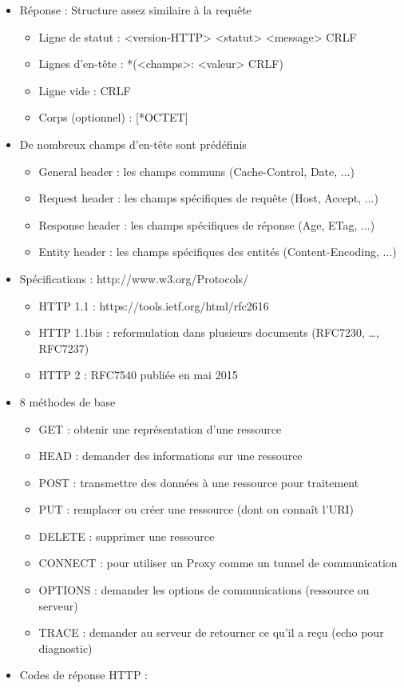 \documentclass[11pt,twoside,a4paper]{article}
\begin{document}
\begin{landscape}
\begin{multicols}{2}
\begin{itemize}
		\item R{\'e}ponse : Structure assez similaire {\`a} la requ{\^e}te
		\begin{itemize}
			\item Ligne de statut : <version-HTTP> <statut> <message> CRLF
			\item Lignes d'en-t{\^e}te : *(<champs>: <valeur> CRLF)
			\item Ligne vide : CRLF
			\item Corps (optionnel) : [*OCTET]
		\end{itemize}
		\item De nombreux champs d'en-t{\^e}te sont pr{\'e}d{\'e}finis
		\begin{itemize}
			\item General header : les champs communs (Cache-Control, Date, ...)
			\item Request header : les champs sp{\'e}cifiques de requ{\^e}te (Host, Accept, ...)
			\item Response header : les champs sp{\'e}cifiques de r{\'e}ponse (Age, ETag, ...)
			\item Entity header : les champs sp{\'e}cifiques des entit{\'e}s (Content-Encoding, ...)
		\end{itemize}
		\item Sp{\'e}cifications : http://www.w3.org/Protocols/
		\begin{itemize}
			\item HTTP 1.1 : https://tools.ietf.org/html/rfc2616
			\item HTTP 1.1bis : reformulation dans plusieurs documents (RFC7230, …, RFC7237)
			\item HTTP 2 : RFC7540 publi{\'e}e en mai 2015
		\end{itemize}
		\item 8 m{\'e}thodes de base
		\begin{itemize}
			\item GET : obtenir une repr{\'e}sentation d'une ressource
			\item HEAD : demander des informations sur une ressource
			\item POST : transmettre des donn{\'e}es {\`a} une ressource pour traitement
			\item PUT : remplacer ou cr{\'e}er une ressource (dont on conna{\^i}t l'URI)
			\item DELETE : supprimer une ressource
			\item CONNECT : pour utiliser un Proxy comme un tunnel de communication
			\item OPTIONS : demander les options de communications (ressource ou serveur)
			\item TRACE : demander au serveur de retourner ce qu'il a re\c{c}u (echo pour diagnostic)
		\end{itemize}
		\item Codes de r{\'e}ponse HTTP : 
	\end{itemize}
	

\end{multicols}
\end{landscape}
\end{document}
